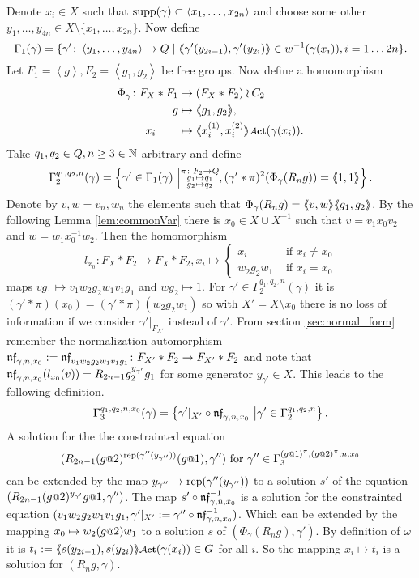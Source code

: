 \documentclass[a4paper,11pt]{amsart}
\begin{document}
 Denote $x_i\in X$ such that $\textup{supp}(\gamma) \subset \left<x_1,\ldots,x_{2n}\right>$ and choose some 
 other $y_1,\ldots,y_{4n} \in X \setminus \{x_1,\ldots,x_{2n}\}$. 
 Now define
 \[\Gamma_1(\gamma) = \{\gamma' \colon \left< y_1,\ldots ,y_{4n}\right> \to Q \mid \langle\negthickspace\langle\gamma'(y_{2i-1}),\gamma'(y_{2i})\rangle\negthickspace\rangle\in w^{-1}(\gamma(x_i)),i=1\ldots2n\}.\] 
 Let $F_1=\left<g\right>,F_2=\left<g_1,g_2\right>$ be free groups. 
 Now define a homomorphism  
 \begin{align*}
  \Phi_{\gamma}\colon F_X*F_1 &\to (F_X*F_2)\wr C_2 \\ g&\mapsto \pair{g_1,g_2},\\ x_i\qquad &\mapsto \pair{x_i^{(1)},x_i^{(2)}}\act(\gamma(x_i)).
 \end{align*}
Take $q_1,q_2 \in Q,n\geq3\in \mathbb{N}$ arbitrary and define
 \[\Gamma_2^{q_1,q_2,n}(\gamma) = \left\{\gamma'\in \Gamma_1(\gamma) \ \middle \vert \substack{\pi\colon F_2\to Q\\
										g_1\mapsto q_1 \\
										g_2\mapsto q_2 }, (\gamma'*\pi)^2(\Phi_\gamma(R_ng))=\langle\negthickspace\langle1,1\rangle\negthickspace\rangle\right\}.\] 
 Denote by $v,w=v_n,w_n$ the elements such that $\Phi_\gamma(R_ng)=\langle\negthickspace\langle v,w\rangle\negthickspace\rangle\langle\negthickspace\langle g_1,g_2\rangle\negthickspace\rangle$. By the following Lemma \ref{lem:commonVar} there is 
 $x_0 \in X\cup X^{-1}$ such that $v=v_1x_0v_2$ and $w=w_1x_0^{-1}w_2$. Then the homomorphism
 \[l_{x_0}\colon F_X*F_2\to F_X*F_2, x_i \mapsto \begin{cases}
						x_i &\text{ if } x_i\neq {x_0} \\
						w_2g_2w_1 &\text{ if }x_i= {x_0} 
                                             \end{cases}\]
 maps $vg_1 \mapsto v_1w_2g_2w_1v_1g_1$ and $wg_2\mapsto 1$. 
 For $\gamma'\in \Gamma_2^{q_1,q_2,n}(\gamma)$ it is $(\gamma'*\pi)(x_0)=({\gamma'*\pi})(w_2g_2w_1)$ so with $X'=X\setminus x_0$ there is no loss of information if 
 we consider $\gamma'|_{F_{X'}}$ instead of $\gamma'$.
 From section \ref{sec:normal_form} remember the normalization 
 automorphism $\mathfrak{nf}_{\gamma,n,x_0}:=\mathfrak{nf}_{v_1w_2g_2w_1v_1g_1}\colon F_{X'}*F_2 \to F_{X'}*F_2$
  and note that
 $\mathfrak{nf}_{\gamma,n,x_0}(l_{x_0}(v))=R_{2n-1}g_2^{{y_{\gamma'}}}g_1$ for some generator ${y_{\gamma'}}\in X$.
 This leads to the following definition.
 \[\Gamma_3^{q_1,q_2,n,x_0}(\gamma) = \left\{\gamma'|_{X'} \circ \mathfrak{nf}_{\gamma,n,x_0} \ \middle \vert \gamma' \in \Gamma_2^{q_1,q_2,n} \right\}.\] 
 A solution for the the constrainted equation
 \[(R_{2n-1}(g\at2)^{\textup{rep}(\gamma''({y_{\gamma''}}))}(g\at1),\gamma'')\textup{ for }\gamma'' \in \Gamma_3^{(g\at{1})^\pi,(g\at{2})^\pi,n,x_0}\]
 can be 
 extended by the map ${y_{\gamma''}}\mapsto \textup{rep}(\gamma''({y_{\gamma''}}))$ to a solution $s'$ 
 of the equation $(R_{2n-1} (g\at{2})^{{y_{\gamma'}}} g\at{1},\gamma'')$. The map $s'\circ \mathfrak{nf}_{\gamma,n,x_0}^{-1}$ 
 is a solution for the constrainted equation $(v_1w_2g_2w_1v_1g_1,\gamma'|_{X'}:=\gamma'' \circ \mathfrak{nf}_{\gamma,n,x_0}^{-1})$.
 Which can be extended by the mapping $x_0\mapsto w_2(g\at{2})w_1$ to a solution $s$ of $(\Phi_\gamma(R_n g),\gamma')$.
 By definition of $\omega$ it is $t_i:=\pair{s(y_{2i-1}),s(y_{2i})}\act(\gamma(x_i)) \in G$ for all $i$. So the mapping $x_i\mapsto t_i$ is a solution for $(R_ng,\gamma)$.
 
\end{document}
